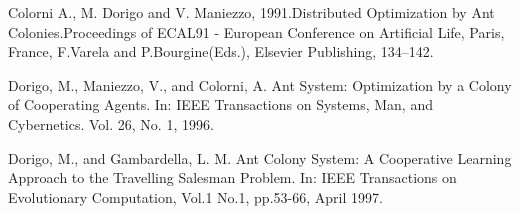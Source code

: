 \documentclass[10pt]{article}
\begin{document}

%
%
\newpage
\begin{thebibliography}{9}
 



Colorni   A.,   M.   Dorigo   and   V.   Maniezzo,   1991.Distributed   Optimization   by   Ant   Colonies.Proceedings  of  ECAL91  -  European  Conference  on Artificial Life, Paris, France, F.Varela and P.Bourgine(Eds.), Elsevier Publishing, 134–142.

Dorigo,  M.,  Maniezzo,  V.,  and  Colorni,  A.  Ant  System:  Optimization  by  a  Colony  of Cooperating Agents. In: IEEE Transactions on Systems, Man, and Cybernetics. Vol. 26, No. 1, 1996.

Dorigo,  M.,  and  Gambardella,  L.  M.  Ant  Colony  System:  A  Cooperative  Learning Approach  to  the  Travelling  Salesman  Problem.  In: IEEE  Transactions  on  Evolutionary Computation, Vol.1 No.1, pp.53-66, April 1997.


\end{thebibliography}
\end{document}
